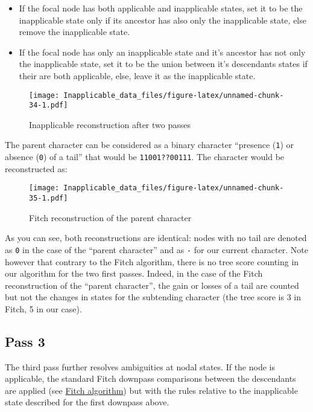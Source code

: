 \documentclass[]{book}
\providecommand{\tightlist}{%
  \setlength{\itemsep}{0pt}\setlength{\parskip}{0pt}}
\theoremstyle{definition}
\theoremstyle{definition}
\theoremstyle{definition}
\theoremstyle{remark}
\begin{document}
\begin{itemize}
\tightlist
\item
  If the focal node has both applicable and inapplicable states, set it
  to be the inapplicable state only if its ancestor has also only the
  inapplicable state, else remove the inapplicable state.
\item
  If the focal node has only an inapplicable state and it's ancestor has
  not only the inapplicable state, set it to be the union between it's
  descendants states if their are both applicable, else, leave it as the
  inapplicable state.
\end{itemize}

\begin{figure}
\centering
\texttt{[image: Inapplicable\_data\_files/figure-latex/unnamed-chunk-34-1.pdf]}
\caption{\label{fig:unnamed-chunk-34}Inapplicable reconstruction after two
passes}
\end{figure}

The parent character can be considered as a binary character ``presence
(\texttt{1}) or absence (\texttt{0}) of a tail'' that would be
\texttt{11001??00111}. The character would be reconstructed as:

\begin{figure}
\centering
\texttt{[image: Inapplicable\_data\_files/figure-latex/unnamed-chunk-35-1.pdf]}
\caption{\label{fig:unnamed-chunk-35}Fitch reconstruction of the parent
character}
\end{figure}

As you can see, both reconstructions are identical: nodes with no tail
are denoted as \texttt{0} in the case of the ``parent character'' and as
\texttt{-} for our current character. Note however that contrary to the
Fitch algorithm, there is no tree score counting in our algorithm for
the two first passes. Indeed, in the case of the Fitch reconstruction of
the ``parent character'', the gain or losses of a tail are counted but
not the changes in states for the subtending character (the tree score
is 3 in Fitch, 5 in our case).

\subsection{Pass 3}\label{pass-3}

The third pass further resolves ambiguities at nodal states. If the node
is applicable, the standard Fitch downpass comparisons between the
descendants are applied (see \protect\hyperlink{fitch}{Fitch algorithm})
but with the rules relative to the inapplicable state described for the
first downpass above.
\end{document}
